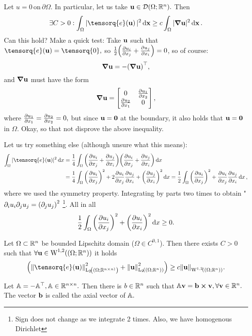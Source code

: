 \documentclass[reqno, a4paper]{article}
\begin{document}
\begin{example}
	Let $u=0 \, \text{on} \, \partial \Omega.$ In particular, let us take $\vb{u} \in \mathcal{D}\qty(\Omega; {\mathbb R}^n).$ Then
	\[
		\exists C>0: \int_{\Omega}|\tensorq{e}\qty(\vb{u})|^{2}\dd{\vb{x}} \geq c \int_{\Omega}|\grad \vb{u}|^{2}\dd{\vb{x}}.
	\]
	Can this hold? Make a quick test: Take $\vb{u}$ such that $\tensorq{e}\qty(\vb{u}) = \tensorq{0}, $ so $\frac{1}{2}\qty(\pdv{u_i}{x_j}+\pdv{u_j}{x_i}) = 0$, so of course:
	\[
		\grad \vb{u} = - \qty(\grad \vb{u})^\top,
	\]
	and $\grad \vb{u}$ must have the form
	\[
		\grad \vb{u} = \begin{bmatrix}
			0 & \pdv{u_1}{x_2} \\
			\pdv{u_2}{x_1} & 0
		\end{bmatrix},
	\]
	where $\pdv{u_1}{x_1} = \pdv{u_2}{x_2} = 0,$ but since $\vb{u} = \vb{0}$ at the boundary, it also holds that $\vb{u} = \vb{0}$ in $\Omega$. Okay, so that not disprove the above inequality.

	Let us try something else (although unsure what this means):
	\begin{align*}
		\int_{\Omega}|\tensorq{e}(\vb{u})|^{2}\dd{x} &= \frac{1}{4}\int_{\Omega}\qty(\pdv{u_i}{x_j}+\pdv{u_j}{x_i})\qty(\pdv{u_i}{x_j}+\pdv{u_j}{x_i})\dd{x} \\
								 &= \frac{1}{4} \int_{\Omega}\qty(\pdv{u_i}{x_j})^{2} + 2\pdv{u_i}{x_j}\pdv{u_j}{x_i} + \qty(\pdv{u_j}{x_i})^{2} \dd{x} = \frac{1}{2}\int_{\Omega}\qty(\pdv{u_i}{x_j})^{2}+ \pdv{u_i}{x_j}\pdv{u_j}{x_i}\dd{x},
	\end{align*}
	where we used the symmetry property. Integrating by parts two times to obtain "$\partial_{i}u_i \partial_{j}u_j = \qty(\partial_{j}u_j)^{2}$ \footnote{Sign does not change as we integrate 2 times. Also, we have homogenous Dirichlet}. All in all
	\[
		\frac{1}{2}\int_{\Omega}\qty(\pdv{u_i}{x_j})^{2} + \qty(\pdv{u_i}{x_i})^{2}\dd{x} \geq 0.
	\]
\end{example}
\begin{theorem}
Let $\Omega \subset {\mathbb R}^n$ be bounded Lipschitz domain ($\Omega \in C^{0,1}$). Then there exists $C>0$ such that $\forall \vb{u} \in \WkpSet[1][2]{\qty(\Omega;\R^n)}$ it holds
\[
\qty(\norm{\tensorq{e}\qty(\vb{u})}_{\LpSet[2]{(\Omega; \R^{n \times n)}}}^{2}+\norm{\vb{u}}_{\LpSet[2]{(\Omega; \R^n)}}^{2}) \geq c \norm{\vb{u}}_{\WkpSet[1][2]{(\Omega;\R^n)}}.
\]
\end{theorem}


\begin{definition}
	Let $\mathbb{A} = - \mathbb{A}^\top, \mathbb{A} \in {\mathbb R}^{n \times n}.$ Then there is $b \in {\mathbb R}^n$ such that $\mathbb{A} \vb{v} = \vb{b} \cross \vb{v}, \forall \vb{v} \in {\mathbb R}^n.$ The vector $\vb{b}$ is called the axial vector of $\mathbb{A}.$
\end{definition}
\end{document}
